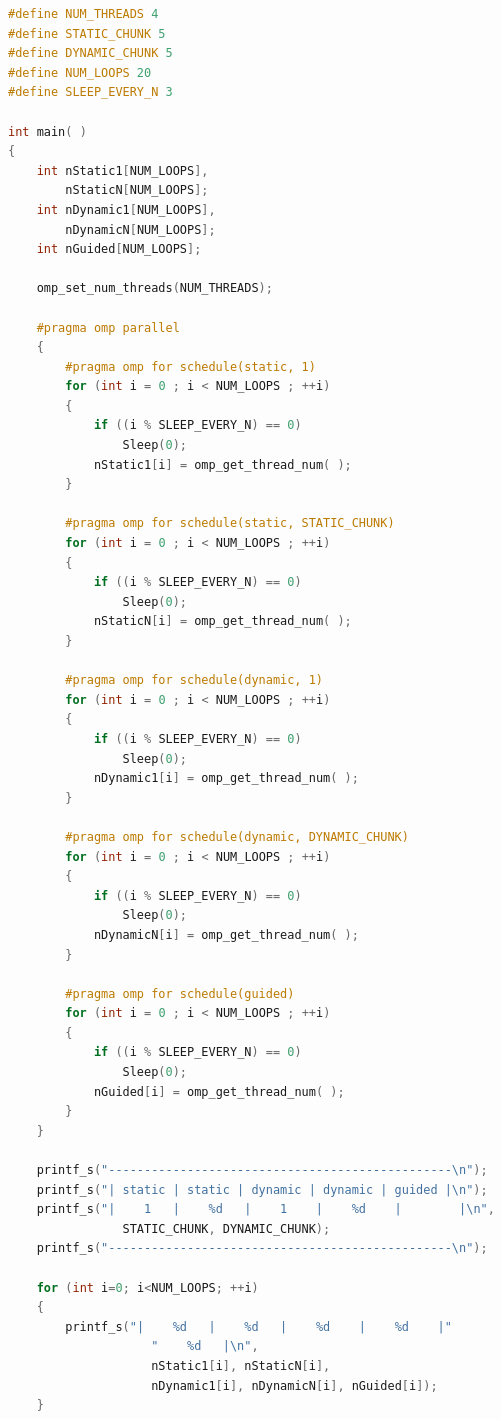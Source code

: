 \begin{itemize}
\begin{examplebox}
\begin{lstlisting}[language=C++]
#define NUM_THREADS 4
#define STATIC_CHUNK 5
#define DYNAMIC_CHUNK 5
#define NUM_LOOPS 20
#define SLEEP_EVERY_N 3

int main( )
{
    int nStatic1[NUM_LOOPS],
        nStaticN[NUM_LOOPS];
    int nDynamic1[NUM_LOOPS],
        nDynamicN[NUM_LOOPS];
    int nGuided[NUM_LOOPS];

    omp_set_num_threads(NUM_THREADS);

    #pragma omp parallel
    {
        #pragma omp for schedule(static, 1)
        for (int i = 0 ; i < NUM_LOOPS ; ++i)
        {
            if ((i % SLEEP_EVERY_N) == 0)
                Sleep(0);
            nStatic1[i] = omp_get_thread_num( );
        }

        #pragma omp for schedule(static, STATIC_CHUNK)
        for (int i = 0 ; i < NUM_LOOPS ; ++i)
        {
            if ((i % SLEEP_EVERY_N) == 0)
                Sleep(0);
            nStaticN[i] = omp_get_thread_num( );
        }

        #pragma omp for schedule(dynamic, 1)
        for (int i = 0 ; i < NUM_LOOPS ; ++i)
        {
            if ((i % SLEEP_EVERY_N) == 0)
                Sleep(0);
            nDynamic1[i] = omp_get_thread_num( );
        }

        #pragma omp for schedule(dynamic, DYNAMIC_CHUNK)
        for (int i = 0 ; i < NUM_LOOPS ; ++i)
        {
            if ((i % SLEEP_EVERY_N) == 0)
                Sleep(0);
            nDynamicN[i] = omp_get_thread_num( );
        }

        #pragma omp for schedule(guided)
        for (int i = 0 ; i < NUM_LOOPS ; ++i)
        {
            if ((i % SLEEP_EVERY_N) == 0)
                Sleep(0);
            nGuided[i] = omp_get_thread_num( );
        }
    }

    printf_s("------------------------------------------------\n");
    printf_s("| static | static | dynamic | dynamic | guided |\n");
    printf_s("|    1   |    %d   |    1    |    %d    |        |\n",
                STATIC_CHUNK, DYNAMIC_CHUNK);
    printf_s("------------------------------------------------\n");

    for (int i=0; i<NUM_LOOPS; ++i)
    {
        printf_s("|    %d   |    %d   |    %d    |    %d    |"
                    "    %d   |\n",
                    nStatic1[i], nStaticN[i],
                    nDynamic1[i], nDynamicN[i], nGuided[i]);
    }


\end{lstlisting}
\end{examplebox}
\end{itemize}
